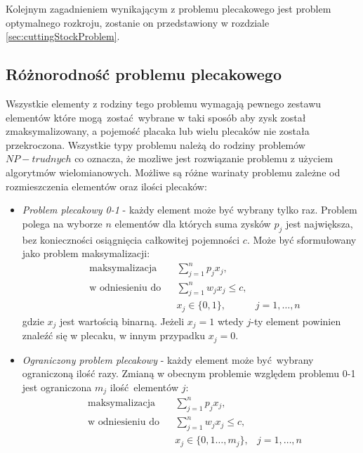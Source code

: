 Kolejnym zagadnieniem wynikającym z problemu plecakowego jest problem optymalnego rozkroju, zostanie on przedstawiony w rozdziale \cref{sec:cuttingStockProblem}.
\subsection{Różnorodność problemu plecakowego}
Wszystkie elementy z rodziny tego problemu wymagają pewnego zestawu elementów które mogą zostać wybrane w taki sposób aby zysk został zmaksymalizowany, a pojemość placaka lub wielu plecaków nie została przekroczona. Wszystkie typy problemu należą do rodziny problemów $NP-trudnych$ co oznacza, że mozliwe jest rozwiązanie problemu z użyciem algorytmów wielomianowych. Możliwe są różne warinaty problemu zależne od rozmieszczenia elementów oraz ilości plecaków\cite{PisingerThesis}:
\begin{itemize}
  \item \textit{Problem plecakowy 0-1} - każdy element może być wybrany tylko raz. Problem polega na wyborze $n$ elementów dla których suma zysków $p_j$ jest największa, bez konieczności osiągnięcia całkowitej pojemności $c$. Może być sformułowany jako problem maksymalizacji:
  \begin{equation}\label{01Knapsack}
    \begin{aligned}
      & \textrm{maksymalizacja} & & \sum_{j=1}^n p_jx_j, \\
      & \textrm{w odniesieniu do} & & \sum_{j=1}^n w_jx_j \le c, \\
      &&& x_j \in \{0,1\},& j = 1,\dots,n
    \end{aligned}
  \end{equation}
  gdzie $x_j$ jest wartością binarną. Jeżeli $x_j = 1$ wtedy $j$-ty element powinien znaleźć się w plecaku, w innym przypadku $x_j = 0$.
  \item \textit{Ograniczony problem plecakowy} - każdy element może być wybrany ograniczoną ilość razy. Zmianą w obecnym problemie względem problemu 0-1 jest ograniczona $m_j$ ilość elementów $j$:
  \begin{equation}\label{boundedKnapsack}
    \begin{aligned}
      & \textrm{maksymalizacja} & & \sum_{j=1}^n p_jx_j, \\
      & \textrm{w odniesieniu do} & & \sum_{j=1}^n w_jx_j \le c, \\
      &&& x_j \in \{0,1\dots,m_j\},& j = 1,\dots,n
    \end{aligned}
  \end{equation}

\end{itemize}
